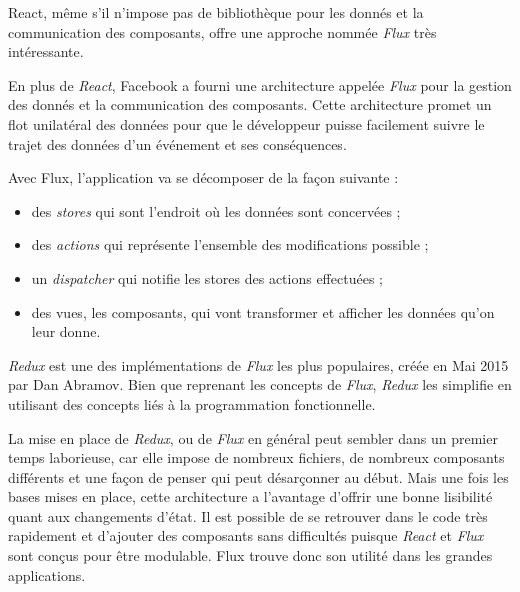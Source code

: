 \documentclass[12pt,a4paper]{article}
\providecommand{\tightlist}{%
  \setlength{\itemsep}{0pt}\setlength{\parskip}{0pt}}
\begin{document}
  \bigskip

  React, même s'il n'impose pas de bibliothèque pour les donnés et la
  communication des composants, offre une approche nommée \emph{Flux} très
  intéressante.

  \bigskip

  En plus de \emph{React}, Facebook a fourni une architecture appelée
  \emph{Flux} pour la gestion des donnés et la communication des
  composants. Cette architecture promet un flot unilatéral des données
  pour que le développeur puisse facilement suivre le trajet des données
  d'un événement et ses conséquences.

  \bigskip

  Avec Flux, l'application va se décomposer de la façon suivante :

  \begin{itemize}
  \tightlist
  \item
    des \emph{stores} qui sont l'endroit où les données sont concervées ;
  \item
    des \emph{actions} qui représente l'ensemble des modifications
    possible ;
  \item
    un \emph{dispatcher} qui notifie les stores des actions effectuées ;
  \item
    des vues, les composants, qui vont transformer et afficher les données
    qu'on leur donne.
  \end{itemize}

  \bigskip

  \emph{Redux} est une des implémentations de \emph{Flux} les plus
  populaires, créée en Mai 2015 par Dan Abramov. Bien que reprenant les
  concepts de \emph{Flux}, \emph{Redux} les simplifie en utilisant des
  concepts liés à la programmation fonctionnelle.

  \bigskip

  La mise en place de \emph{Redux}, ou de \emph{Flux} en général peut
  sembler dans un premier temps laborieuse, car elle impose de nombreux
  fichiers, de nombreux composants différents et une façon de penser qui
  peut désarçonner au début. Mais une fois les bases mises en place, cette
  architecture a l'avantage d'offrir une bonne lisibilité quant aux
  changements d'état. Il est possible de se retrouver dans le code très
  rapidement et d'ajouter des composants sans difficultés puisque
  \emph{React} et \emph{Flux} sont conçus pour être modulable. Flux trouve
  donc son utilité dans les grandes applications.

  \bigskip
\end{document}
